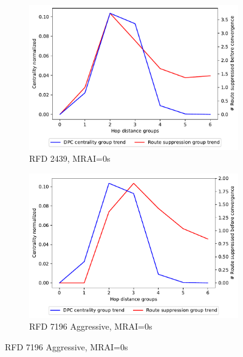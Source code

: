 \begin{figure}[H]
     \centering
     \begin{subfigure}[b]{0.325\textwidth}
         \centering
         \includegraphics[width=\textwidth]{images/RFD/miceVSelephants/MultiMRAI/0/mice/cisco_1000_RFD_nodeConvergence_centVSsup_trend.pdf}
         \caption{\scriptsize RFD 2439, MRAI=0s}
         \label{fig:1000_2439RFD_centVSsup_mices_MRAI0}
     \end{subfigure}
     \hfill
     \begin{subfigure}[b]{0.325\textwidth}
         \centering
         \includegraphics[width=\textwidth]{images/RFD/miceVSelephants/MultiMRAI/0/mice/cisco_1000_RFD_7196_aggressive_nodeConvergence_centVSsup_trend.pdf}
         \caption{\scriptsize RFD 7196 Aggressive, MRAI=0s}
         \label{fig:1000_7196RFDA_centVSsup_mices_MRAI0}

\end{subfigure}
\end{figure}
